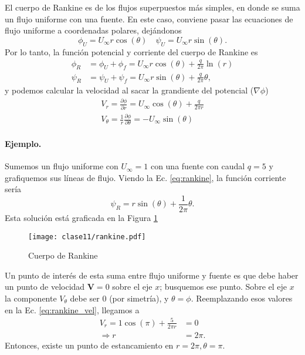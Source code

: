 El cuerpo de Rankine es de los flujos superpuestos más simples, en donde se suma un flujo uniforme con una fuente.
En este caso, conviene pasar las ecuaciones de flujo uniforme a coordenadas polares, dejándonos
%
\begin{equation}
\phi_U = U_\infty r\cos(\theta) \quad \psi_U = U_\infty r\sin(\theta).
\end{equation}
%
Por lo tanto, la función potencial y corriente del cuerpo de Rankine es
%
\begin{align}\label{eq:rankine}
\phi_R &= \phi_U+\phi_f = U_\infty r\cos(\theta) + \frac{q}{2\pi}\ln(r)\nonumber\\
\psi_R &= \psi_U+\psi_f = U_\infty r\sin(\theta) + \frac{q}{2\pi}\theta,
\end{align}
%
y podemos calcular la velocidad al sacar la grandiente del potencial ($\nabla\phi$)
%
\begin{align}\label{eq:rankine_vel}
V_r = \frac{\partial\phi}{\partial r} = U_\infty\cos(\theta) + \frac{q}{2\pi r} \nonumber\\
V_\theta = \frac{1}{r}\frac{\partial\phi}{\partial\theta} = -U_\infty\sin(\theta)
\end{align}

\paragraph{Ejemplo.}
Sumemos un flujo uniforme con $U_\infty=1$ con una fuente con caudal $q=5$ y grafiquemos sus líneas de flujo.
Viendo la Ec. \eqref{eq:rankine}, la función corriente sería
%
\begin{equation}\label{eq:rankine_ej}
\psi_R = r\sin(\theta)+\frac{1}{2\pi}\theta.
\end{equation}
%
Esta solución está graficada en la Figura \ref{fig:rankine}
%
\begin{figure}[h!]
\centering
\texttt{[image: clase11/rankine.pdf]}
\caption{Cuerpo de Rankine}
\label{fig:rankine}
\end{figure}

Un punto de interés de esta suma entre flujo uniforme y fuente es que debe haber un punto de velocidad $\mathbf{V}=0$ sobre el eje $x$; busquemos ese punto.
Sobre el eje $x$ la componente $V_\theta$ debe ser 0 (por simetría), y $\theta=\phi$.
Reemplazando esos valores en la Ec. \eqref{eq:rankine_vel}, llegamos a
%
\begin{align}
V_r = 1\cos(\pi) + \frac{5}{2\pi r} &= 0\nonumber\\
\Rightarrow r &= 2\pi.
\end{align}
%
Entonces, existe un punto de estancamiento en $r=2\pi, \theta=\pi$.

